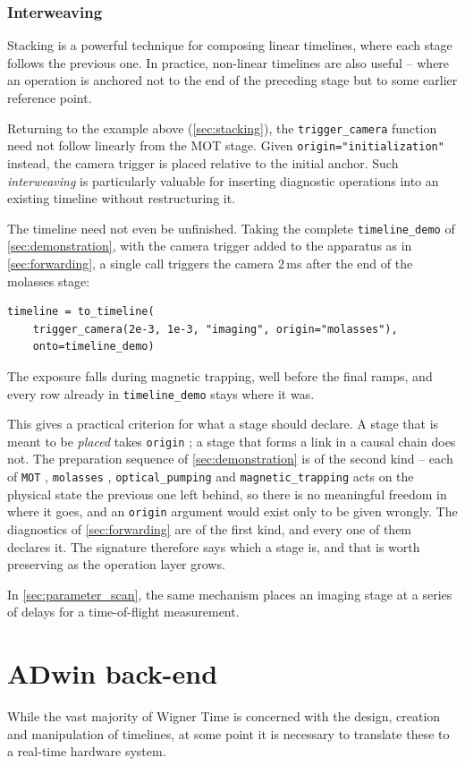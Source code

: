 \documentclass{SciPost}
\newcommand{\python}[1]{%
  \texttt{#1}%
}
\begin{document}
\subsubsection{Interweaving}
\label{sec:interweaving}
Stacking is a powerful technique for composing linear timelines, where each stage follows the previous one. In practice, non-linear timelines are also useful – where an operation is anchored not to the end of the preceding stage but to some earlier reference point.
 
Returning to the example above (\cref{sec:stacking}), the \python{trigger_camera} function need not follow linearly from the MOT stage. Given \python{origin="initialization"} instead, the camera trigger is placed relative to the initial anchor. Such \emph{interweaving} is particularly valuable for inserting diagnostic operations into an existing timeline without restructuring it.

The timeline need not even be unfinished. Taking the complete \python{timeline_demo} of \cref{sec:demonstration}, with the camera trigger added to the apparatus as in \cref{sec:forwarding}, a single call triggers the camera 2\,ms after the end of the molasses stage:
\begin{verbatim}
timeline = to_timeline(
    trigger_camera(2e-3, 1e-3, "imaging", origin="molasses"),
    onto=timeline_demo)
\end{verbatim}
%
The exposure falls during magnetic trapping, well before the final ramps, and every row already in \python{timeline_demo} stays where it was.

This gives a practical criterion for what a stage should declare. A stage that is meant to be \emph{placed} takes \python{origin}; a stage that forms a link in a causal chain does not. The preparation sequence of \cref{sec:demonstration} is of the second kind – each of \python{MOT}, \python{molasses}, \python{optical_pumping} and \python{magnetic_trapping} acts on the physical state the previous one left behind, so there is no meaningful freedom in where it goes, and an \python{origin} argument would exist only to be given wrongly. The diagnostics of \cref{sec:forwarding} are of the first kind, and every one of them declares it. The signature therefore says which a stage is, and that is worth preserving as the operation layer grows.
 
In \cref{sec:parameter_scan}, the same mechanism places an imaging stage at a series of delays for a time-of-flight measurement.
 
\section{ADwin back-end}
\label{sec:adwin}
While the vast majority of Wigner Time is concerned with the design, creation and manipulation of timelines, at some point it is necessary to translate these to a real-time hardware system.
 
\end{document}
